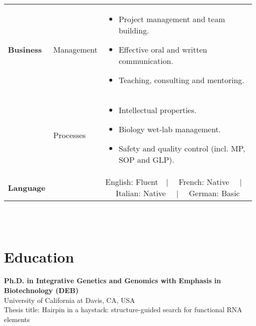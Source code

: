 \documentclass{CV}
\begin{document}
\begin{tabular}{p{} p{} p{}}
\textbf{Business} & 
	Management &
		\begin{itemize}\setlength\itemsep{-0.5em}
		\vspace{-1.8em}
		\item Project management and team building.
		\item Effective oral and written communication.
		\item Teaching, consulting and mentoring.
		\end{itemize}\\
& 
	Processes &
		\begin{itemize}\setlength\itemsep{-0.5em}
		\vspace{-1.8em}
		\item Intellectual properties.
		\item Biology wet-lab management.
		\item Safety and quality control (incl. MP, SOP and GLP).
		\end{itemize}\\
\textbf{Language} && English: Fluent~~|~~ French: Native ~~|~~ Italian: Native ~~|~~ German: Basic\\
\end{tabular}
\\\\






\section*{Education}
\textbf{Ph.D. in  Integrative Genetics and Genomics with Emphasis in Biotechnology (DEB)}  \hfill {}\\
University of California at Davis, CA, USA\\
Thesis title: Hairpin in a haystack: structure-guided search for functional RNA elements\\
\end{document}
